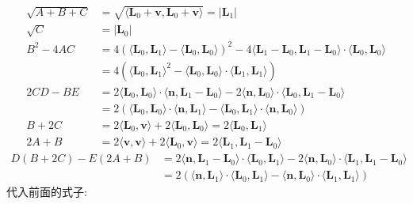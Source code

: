 \begin{align*}
\sqrt{A+B+C} &= \sqrt{\langle\mathbf{L}_0+\mathbf{v},\mathbf{L}_0+\mathbf{v}\rangle} = |\mathbf{L}_1| \\
\sqrt{C} &= |\mathbf{L}_0|\\
B^2-4AC &= 4(\langle\mathbf{L}_0,\mathbf{L}_1\rangle-\langle\mathbf{L}_0,\mathbf{L}_0\rangle)^2 - 4\langle\mathbf{L}_1-\mathbf{L}_0,\mathbf{L}_1-\mathbf{L}_0\rangle\cdot\langle\mathbf{L}_0,\mathbf{L}_0\rangle \\
&= 4(\langle\mathbf{L}_0,\mathbf{L}_1\rangle^2 - \langle\mathbf{L}_0,\mathbf{L}_0\rangle\cdot\langle\mathbf{L}_1,\mathbf{L}_1\rangle)\\
2CD-BE &= 2\langle\mathbf{L}_0,\mathbf{L}_0 \rangle\cdot\langle\mathbf{n},\mathbf{L}_1-\mathbf{L}_0\rangle - 2\langle\mathbf{n},\mathbf{L}_0 \rangle\cdot\langle\mathbf{L}_0,\mathbf{L}_1-\mathbf{L}_0\rangle\\
&= 2(\langle\mathbf{L}_0,\mathbf{L}_0 \rangle\cdot\langle\mathbf{n},\mathbf{L}_1\rangle - \langle\mathbf{L}_0,\mathbf{L}_1 \rangle\cdot\langle\mathbf{n},\mathbf{L}_0\rangle) \\
B+2C &= 2\langle\mathbf{L}_0,\mathbf{v}\rangle + 2\langle\mathbf{L}_0,\mathbf{L}_0\rangle = 2\langle\mathbf{L}_0,\mathbf{L}_1\rangle \\
2A+B &= 2\langle\mathbf{v},\mathbf{v}\rangle + 2\langle\mathbf{L}_0,\mathbf{v}\rangle = 2\langle\mathbf{L}_1,\mathbf{L}_1 - \mathbf{L}_0\rangle
\end{align*}
\begin{align*}
D(B+2C)-E(2A+B) &= 2\langle\mathbf{n},\mathbf{L}_1-\mathbf{L}_0\rangle \cdot \langle\mathbf{L}_0,\mathbf{L}_1\rangle - 2\langle\mathbf{n},\mathbf{L}_0\rangle\cdot\langle\mathbf{L}_1,\mathbf{L}_1 - \mathbf{L}_0\rangle\\
&= 2(\langle\mathbf{n},\mathbf{L}_1\rangle\cdot\langle\mathbf{L}_0,\mathbf{L}_1\rangle - \langle\mathbf{n},\mathbf{L}_0\rangle\cdot\langle\mathbf{L}_1,\mathbf{L}_1\rangle)
\end{align*}
代入前面的式子:
